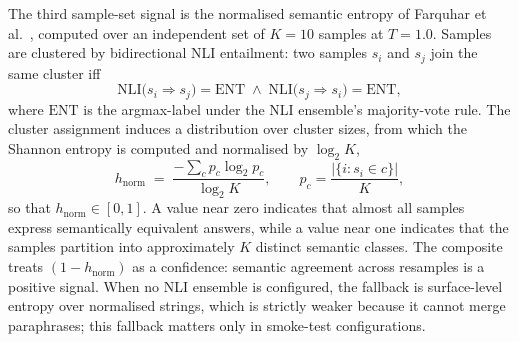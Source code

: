 The third sample-set signal is the normalised semantic entropy of Farquhar et al.~\cite{farquhar2024semantic}, computed over an independent set of $K = 10$ samples at $T = 1.0$. Samples are clustered by bidirectional NLI entailment: two samples $s_{i}$ and $s_{j}$ join the same cluster iff
\begin{equation}
\mathrm{NLI}\bigl(s_{i} \Rightarrow s_{j}\bigr) = \mathrm{ENT} \;\wedge\; \mathrm{NLI}\bigl(s_{j} \Rightarrow s_{i}\bigr) = \mathrm{ENT},
\label{eq:semantic-cluster}
\end{equation}
where $\mathrm{ENT}$ is the argmax-label under the NLI ensemble's majority-vote rule. The cluster assignment induces a distribution over cluster sizes, from which the Shannon entropy is computed and normalised by $\log_{2} K$,
\begin{equation}
h_{\text{norm}} \;=\; \frac{-\sum_{c} p_{c}\log_{2} p_{c}}{\log_{2} K}, \qquad p_{c} = \frac{|\{i : s_{i} \in c\}|}{K},
\label{eq:hnorm}
\end{equation}
so that $h_{\text{norm}} \in [0, 1]$. A value near zero indicates that almost all samples express semantically equivalent answers, while a value near one indicates that the samples partition into approximately $K$ distinct semantic classes. The composite treats $(1 - h_{\text{norm}})$ as a confidence: semantic agreement across resamples is a positive signal. When no NLI ensemble is configured, the fallback is surface-level entropy over normalised strings, which is strictly weaker because it cannot merge paraphrases; this fallback matters only in smoke-test configurations.

